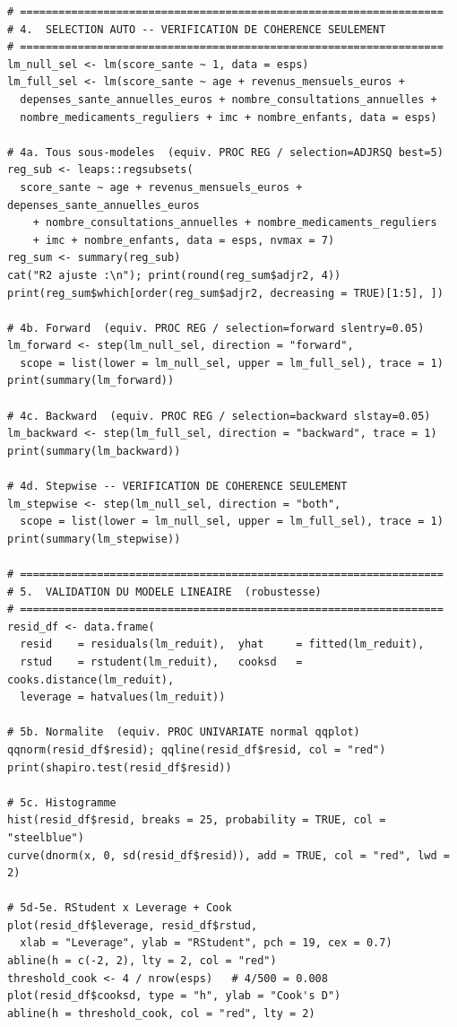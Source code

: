 \documentclass[11pt,a4paper]{memoirerecherche}
\begin{document}
\begin{footnotesize}
\begin{verbatim}
# ==================================================================
# 4.  SELECTION AUTO -- VERIFICATION DE COHERENCE SEULEMENT
# ==================================================================
lm_null_sel <- lm(score_sante ~ 1, data = esps)
lm_full_sel <- lm(score_sante ~ age + revenus_mensuels_euros +
  depenses_sante_annuelles_euros + nombre_consultations_annuelles +
  nombre_medicaments_reguliers + imc + nombre_enfants, data = esps)

# 4a. Tous sous-modeles  (equiv. PROC REG / selection=ADJRSQ best=5)
reg_sub <- leaps::regsubsets(
  score_sante ~ age + revenus_mensuels_euros + depenses_sante_annuelles_euros
    + nombre_consultations_annuelles + nombre_medicaments_reguliers
    + imc + nombre_enfants, data = esps, nvmax = 7)
reg_sum <- summary(reg_sub)
cat("R2 ajuste :\n"); print(round(reg_sum$adjr2, 4))
print(reg_sum$which[order(reg_sum$adjr2, decreasing = TRUE)[1:5], ])

# 4b. Forward  (equiv. PROC REG / selection=forward slentry=0.05)
lm_forward <- step(lm_null_sel, direction = "forward",
  scope = list(lower = lm_null_sel, upper = lm_full_sel), trace = 1)
print(summary(lm_forward))

# 4c. Backward  (equiv. PROC REG / selection=backward slstay=0.05)
lm_backward <- step(lm_full_sel, direction = "backward", trace = 1)
print(summary(lm_backward))

# 4d. Stepwise -- VERIFICATION DE COHERENCE SEULEMENT
lm_stepwise <- step(lm_null_sel, direction = "both",
  scope = list(lower = lm_null_sel, upper = lm_full_sel), trace = 1)
print(summary(lm_stepwise))

# ==================================================================
# 5.  VALIDATION DU MODELE LINEAIRE  (robustesse)
# ==================================================================
resid_df <- data.frame(
  resid    = residuals(lm_reduit),  yhat     = fitted(lm_reduit),
  rstud    = rstudent(lm_reduit),   cooksd   = cooks.distance(lm_reduit),
  leverage = hatvalues(lm_reduit))

# 5b. Normalite  (equiv. PROC UNIVARIATE normal qqplot)
qqnorm(resid_df$resid); qqline(resid_df$resid, col = "red")
print(shapiro.test(resid_df$resid))

# 5c. Histogramme
hist(resid_df$resid, breaks = 25, probability = TRUE, col = "steelblue")
curve(dnorm(x, 0, sd(resid_df$resid)), add = TRUE, col = "red", lwd = 2)

# 5d-5e. RStudent x Leverage + Cook
plot(resid_df$leverage, resid_df$rstud,
  xlab = "Leverage", ylab = "RStudent", pch = 19, cex = 0.7)
abline(h = c(-2, 2), lty = 2, col = "red")
threshold_cook <- 4 / nrow(esps)   # 4/500 = 0.008
plot(resid_df$cooksd, type = "h", ylab = "Cook's D")
abline(h = threshold_cook, col = "red", lty = 2)


\end{verbatim}
\end{footnotesize}
\end{document}
